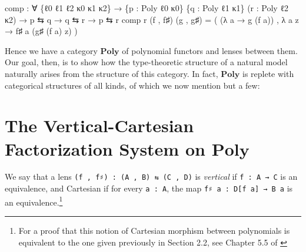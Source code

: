 \documentclass[
  11pt,
  oneside,
  article]{memoir}
\newenvironment{Shaded}{}{}
\newcommand{\NormalTok}[1]{#1}
\newcommand{\OtherTok}[1]{\textcolor[rgb]{0.00,0.44,0.13}{#1}}
\theoremstyle{definition}
\theoremstyle{plain}
\newcommand{\0}{\textsf{0}}
\newcommand{\1}{\tn{\textsf{1}}}
\begin{document}
\begin{Shaded}
\begin{Highlighting}[]
\NormalTok{comp }\OtherTok{:} \OtherTok{∀} \OtherTok{\{}\NormalTok{ℓ0 ℓ1 ℓ2 κ0 κ1 κ2}\OtherTok{\}}
       \OtherTok{→} \OtherTok{\{}\NormalTok{p }\OtherTok{:}\NormalTok{ Poly ℓ0 κ0}\OtherTok{\}} \OtherTok{\{}\NormalTok{q }\OtherTok{:}\NormalTok{ Poly ℓ1 κ1}\OtherTok{\}} \OtherTok{(}\NormalTok{r }\OtherTok{:}\NormalTok{ Poly ℓ2 κ2}\OtherTok{)}
       \OtherTok{→}\NormalTok{ p ⇆ q }\OtherTok{→}\NormalTok{ q ⇆ r }\OtherTok{→}\NormalTok{ p ⇆ r}
\NormalTok{comp r }\OtherTok{(}\NormalTok{f , f♯}\OtherTok{)} \OtherTok{(}\NormalTok{g , g♯}\OtherTok{)} \OtherTok{=} 
     \OtherTok{(} \OtherTok{(λ}\NormalTok{ a }\OtherTok{→}\NormalTok{ g }\OtherTok{(}\NormalTok{f a}\OtherTok{))}\NormalTok{ , }\OtherTok{λ}\NormalTok{ a z }\OtherTok{→}\NormalTok{ f♯ a }\OtherTok{(}\NormalTok{g♯ }\OtherTok{(}\NormalTok{f a}\OtherTok{)}\NormalTok{ z}\OtherTok{)} \OtherTok{)}
\end{Highlighting}
\end{Shaded}

Hence we have a category \(\mathbf{Poly}\) of polynomial functors and
lenses between them. Our goal, then, is to show how the type-theoretic
structure of a natural model naturally arises from the structure of this
category. In fact, \(\mathbf{Poly}\) is replete with categorical
structures of all kinds, of which we now mention but a few:

\section{\texorpdfstring{The Vertical-Cartesian Factorization System on
\(\mathbf{Poly}\)}{The Vertical-Cartesian Factorization System on \textbackslash mathbf\{Poly\}}}\label{the-vertical-cartesian-factorization-system-on-mathbfpoly}

We say that a lens \texttt{(f\ ,\ f♯)\ :\ (A\ ,\ B)\ ⇆\ (C\ ,\ D)} is
\emph{vertical} if \texttt{f\ :\ A\ →\ C} is an equivalence, and
Cartesian if for every \texttt{a\ :\ A}, the map
\texttt{f♯\ a\ :\ D{[}f\ a{]}\ →\ B\ a} is an
equivalence.\footnote{For a proof that this notion of Cartesian morphism between polynomials is equivalent to the one given previously in Section 2.2, see Chapter 5.5 of \cite{niu2024polynomial}}
\end{document}
